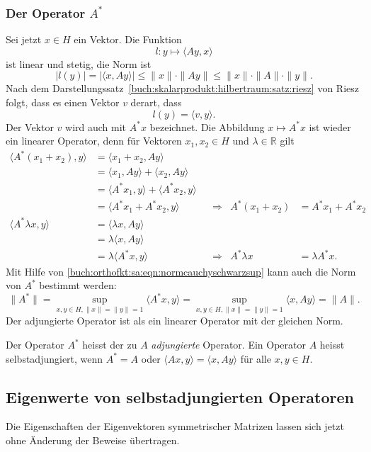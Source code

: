 %
%
\subsubsection{Der Operator $A^*$}
Sei jetzt $x\in H$ ein Vektor.
Die Funktion
\[
l
\colon
y\mapsto \langle Ay,x\rangle
\]
ist linear und stetig, die Norm ist
\[
|l(y)|
=
|\langle x, Ay\rangle|
\le
\|x\|
\cdot
\|Ay\|
\le
\|x\| \cdot \|A\| \cdot \|y\|
.
\]
Nach dem Darstellungssatz~\ref{buch:skalarprodukt:hilbertraum:satz:riesz}
von Riesz folgt, dass es einen Vektor $v$ derart, dass
\[
l(y) = \langle v,y\rangle.
\]
Der Vektor $v$ wird auch mit $A^*x$ bezeichnet.
Die Abbildung $x\mapsto A^*x$ ist wieder ein linearer Operator, denn
für Vektoren $x_1,x_2\in H$ und $\lambda\in\mathbb{R}$ gilt
\begin{align*}
\langle A^*(x_1+x_2),y\rangle
&=
\langle x_1+x_2,Ay\rangle
\\
&=
\langle x_1,Ay\rangle
+
\langle x_2,Ay\rangle
\\
&=
\langle A^*x_1,y\rangle
+
\langle A^*x_2,y\rangle
\\
&=
\langle A^*x_1+A^*x_2,y\rangle
&&\Rightarrow&
A^*(x_1+x_2)&=A^*x_1 + A^*x_2
\\
\langle A^*\lambda x,y\rangle
&=
\langle \lambda x,Ay\rangle
\\
&=
\lambda \langle x,Ay\rangle
\\
&=
\lambda \langle A^*x,y\rangle
&&\Rightarrow&
A^*\lambda x&=\lambda A^*x.
\end{align*}
Mit Hilfe von
\eqref{buch:orthofkt:sa:eqn:normcauchyschwarzsup}
kann auch die Norm von $A^*$ bestimmt werden:
\[
\|A^*\|
=
\sup_{x,y\in H, \|x\|=\|y\|=1} \langle A^*x,y\rangle
=
\sup_{x,y\in H, \|x\|=\|y\|=1} \langle x,Ay\rangle
=
\|A\|.
\]
Der adjungierte Operator ist als ein linearer Operator mit
der gleichen Norm.

\begin{definition}
Der Operator $A^*$ heisst der zu $A$ {\em adjungierte} Operator.
Ein Operator $A$ heisst selbstadjungiert, wenn $A^*=A$ oder
$\langle Ax,y\rangle = \langle x,Ay\rangle$ für alle $x,y\in H$.
\end{definition}


%
%
\subsection{Eigenwerte von selbstadjungierten Operatoren}
Die Eigenschaften der Eigenvektoren symmetrischer Matrizen lassen
sich jetzt ohne Änderung der Beweise übertragen.

